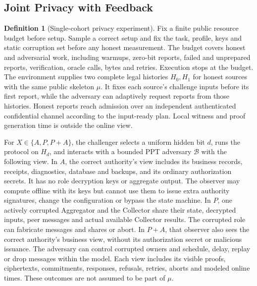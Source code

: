 \documentclass[conference,compsoc]{IEEEtran}
\theoremstyle{definition}
\newtheorem{definition}{Definition}[section]
\newtheorem{definition}{Definition}
\numberwithin{equation}{section}
\numberwithin{table}{section}
\numberwithin{figure}{section}
\theoremstyle{plain}
\begin{document}
\subsection{Joint Privacy with Feedback}
\label{sec:joint-privacy}

\begin{definition}[Single-cohort privacy experiment]
\label{game:privacy}
Fix a finite public resource budget before setup. Sample a correct setup and
fix the task, profile, keys and static corruption set before any honest
measurement. The budget covers honest and
adversarial work, including warmups, zero-bit reports, failed and unprepared
reports, verification, oracle calls, bytes and retries. Execution stops at the
budget. The environment supplies two complete legal histories \(H_0,H_1\) for
honest sources with the same public skeleton \(\mu\). It fixes each source's
challenge inputs before its first report, while the adversary can adaptively
request reports from those histories. Honest reports reach admission over an
independent authenticated confidential channel according to the input-ready
plan. Local witness and proof generation time is outside the online view.

For \(X\in\{A,P,P{+}A\}\), the challenger selects a uniform hidden bit \(d\), runs
the protocol on \(H_d\), and interacts with a bounded PPT adversary
\(\mathcal B\) with the following view. In \(A\),
the correct authority's view includes its business records, receipts,
diagnostics, database and backups, and its ordinary authorization secrets.
It has no role decryption keys or aggregate output. The observer may compute
offline with its keys but cannot use them to issue extra authority signatures,
change the configuration or bypass the state machine. In \(P\), one actively corrupted
Aggregator and the Collector share their state, decrypted inputs, peer
messages and actual available Collector results. The corrupted role can
fabricate messages and shares or abort. In \(P{+}A\), that observer also sees
the correct authority's business view, without its authorization secret or
malicious issuance. The adversary can control corrupted owners and schedule,
delay, replay or drop messages within the model. Each view includes its
visible proofs, ciphertexts, commitments, responses, refusals, retries, aborts
and modeled online times. These outcomes are not assumed to be part of \(\mu\).


\end{definition}
\end{document}
